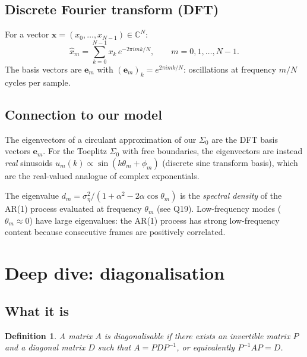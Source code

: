 \documentclass[11pt,a4paper]{article}
\newtheorem{definition}[theorem]{Definition}
\newcommand{\C}{\mathbb{C}}
\newcommand{\sigeta}{\sigma_\eta^2}
\begin{document}
\subsection{Discrete Fourier transform (DFT)}

For a vector $\mathbf{x} = (x_0, \dots, x_{N-1}) \in \C^N$:
\begin{equation}
  \hat{x}_m = \sum_{k=0}^{N-1} x_k\,e^{-2\pi i mk/N}, \qquad m = 0, 1, \dots, N-1.
\end{equation}
The basis vectors are $\mathbf{e}_m$ with $(\mathbf{e}_m)_k = e^{2\pi imk/N}$: oscillations at frequency $m/N$ cycles per sample.

\subsection{Connection to our model}

The eigenvectors of a circulant approximation of our $\Sigma_0$ are the DFT basis vectors $\mathbf{e}_m$.  For the Toeplitz $\Sigma_0$ with free boundaries, the eigenvectors are instead \emph{real} sinusoids $u_m(k) \propto \sin(k\theta_m + \phi_m)$ (discrete sine transform basis), which are the real-valued analogue of complex exponentials.

The eigenvalue $d_m = \sigeta/(1 + \alpha^2 - 2\alpha\cos\theta_m)$ is the \emph{spectral density} of the AR(1) process evaluated at frequency $\theta_m$ (see Q19).  Low-frequency modes ($\theta_m \approx 0$) have large eigenvalues: the AR(1) process has strong low-frequency content because consecutive frames are positively correlated.


\section{Deep dive: diagonalisation}
\label{sec:q18}

\subsection{What it is}

\begin{definition}
A matrix $A$ is \emph{diagonalisable} if there exists an invertible matrix $P$ and a diagonal matrix $D$ such that $A = PDP^{-1}$, or equivalently $P^{-1}AP = D$.
\end{definition}
\end{document}
